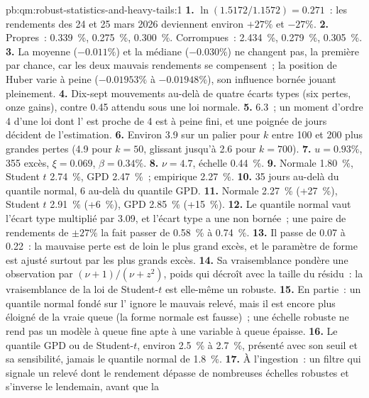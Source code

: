 \begin{solution}{pb:qm:robust-statistics-and-heavy-tails:1}
\textbf{1.} $\ln(1.5172/1.1572) = 0.271$~: les rendements des 24 et 25 mars 2026 deviennent environ $+27\%$ et $-27\%$.
\textbf{2.} Propres~: 0.339~\%, 0.275~\%, 0.300~\%. Corrompues~: 2.434~\%, 0.279~\%, 0.305~\%.
\textbf{3.} La moyenne ($-0.011\%$) et la médiane ($-0.030\%$) ne changent pas, la première par chance, car les deux mauvais rendements se compensent~; la
position de Huber varie à peine ($-0.01953\%$ à $-0.01948\%$), son influence bornée jouant pleinement.
\textbf{4.} Dix-sept mouvements au-delà de quatre écarts types (six pertes, onze gains), contre 0.45 attendu sous une loi normale.
\textbf{5.} 6.3~; un moment d'ordre 4 d'une loi dont l' est proche de 4 est à peine fini, et une poignée de jours décident de l'estimation.
\textbf{6.} Environ 3.9 sur un palier pour $k$ entre 100 et 200 plus grandes pertes (4.9 pour $k = 50$, glissant jusqu'à 2.6 pour $k = 700$).
\textbf{7.} $u = 0.93\%$, 355 excès, $\xi = 0.069$, $\beta = 0.34\%$.
\textbf{8.} $\nu = 4.7$, échelle 0.44~\%.
\textbf{9.} Normale 1.80~\%, Student $t$ 2.74~\%, GPD 2.47~\%~; empirique 2.27~\%.
\textbf{10.} 35 jours au-delà du quantile normal, 6 au-delà du quantile GPD.
\textbf{11.} Normale 2.27~\% (+27~\%), Student $t$ 2.91~\% (+6~\%), GPD 2.85~\% (+15~\%).
\textbf{12.} Le quantile normal vaut l'écart type multiplié par 3.09, et l'écart type a une  non bornée~; une
paire de rendements de $\pm 27\%$ la fait passer de 0.58~\% à 0.74~\%.
\textbf{13.} Il passe de 0.07 à 0.22~: la mauvaise perte est de loin le plus grand excès, et le paramètre de forme est ajusté surtout par les plus grands
excès.
\textbf{14.} Sa vraisemblance pondère une observation par $(\nu + 1)/(\nu + z^2)$, poids qui décroît avec la taille du résidu~: la vraisemblance de la loi de Student-$t$ est elle-même un
 robuste.
\textbf{15.} En partie~: un quantile normal fondé sur l' ignore le mauvais relevé, mais il est encore plus éloigné de la vraie queue (la forme normale est fausse)~; une
échelle robuste ne rend pas un modèle à queue fine apte à une variable à queue épaisse.
\textbf{16.} Le quantile GPD ou de Student-$t$, environ 2.5~\% à 2.7~\%, présenté avec son seuil et sa sensibilité, jamais le quantile normal de 1.8~\%.
\textbf{17.} À l'ingestion~: un filtre qui signale un relevé dont le rendement dépasse de nombreuses échelles robustes et s'inverse le lendemain, avant que la

\end{solution}
